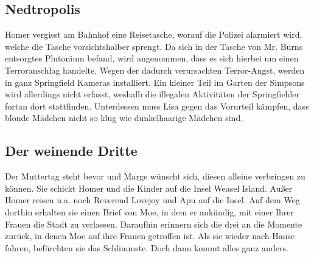 
\subsection{Nedtropolis}
Homer vergisst am Bahnhof eine Reisetasche, worauf die Polizei alarmiert wird, welche die Tasche vorsichtshalber sprengt. Da sich in der Tasche von Mr. Burns entsorgtes Plutonium befand, wird angenommen, dass es sich hierbei um einen Terroranschlag handelte. Wegen der dadurch verursachten Terror-Angst, werden in ganz Springfield Kameras installiert. Ein kleiner Teil im Garten der Simpsons wird allerdings nicht erfasst, weshalb die illegalen Aktivitäten der Springfielder fortan dort stattfinden. Unterdessen muss Lisa gegen das Vorurteil kämpfen, dass blonde Mädchen nicht so klug wie dunkelhaarige Mädchen sind.



\subsection{Der weinende Dritte}\label{MABF13}
Der Muttertag steht bevor und Marge wünscht sich, diesen alleine verbringen zu können. Sie schickt Homer und die Kinder auf die Insel \glqq Weasel Island\grqq . Außer Homer reisen u.a. noch Reverend Lovejoy und Apu auf die Insel.  Auf dem Weg dorthin erhalten sie einen Brief von Moe, in dem er ankündig, mit einer Ihrer Frauen die Stadt zu verlassen. Daraufhin erinnern sich die drei an die Momente zurück, in denen Moe auf ihre Frauen getroffen ist. Als sie wieder nach Hause fahren, befürchten sie das Schlimmste. Doch dann kommt alles ganz anders. 

